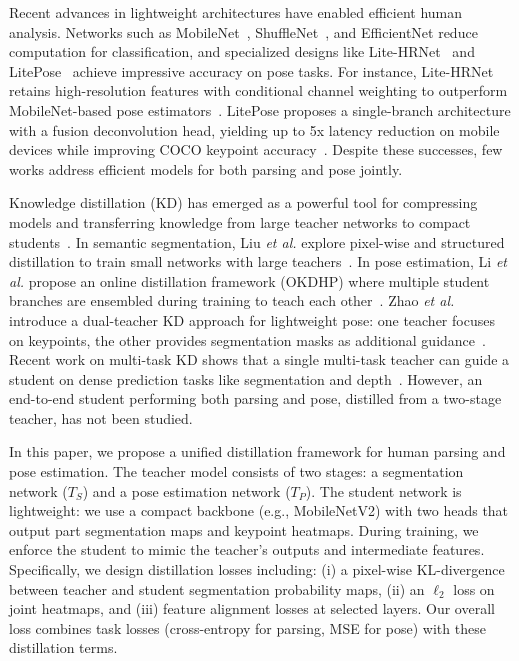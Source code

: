 \documentclass{article}
\begin{document}
Recent advances in lightweight architectures have enabled efficient human analysis. Networks such as MobileNet~\cite{howard2017mobilenets}, ShuffleNet~\cite{zhang2018shufflenet}, and EfficientNet reduce computation for classification, and specialized designs like Lite-HRNet~\cite{yu2021litehrnet} and LitePose~\cite{wang2022litepose} achieve impressive accuracy on pose tasks. For instance, Lite-HRNet retains high-resolution features with conditional channel weighting to outperform MobileNet-based pose estimators~\cite{yu2021litehrnet}. LitePose proposes a single-branch architecture with a fusion deconvolution head, yielding up to 5x latency reduction on mobile devices while improving COCO keypoint accuracy~\cite{wang2022litepose}. Despite these successes, few works address efficient models for both parsing and pose jointly.

Knowledge distillation (KD) has emerged as a powerful tool for compressing models and transferring knowledge from large teacher networks to compact students~\cite{hinton2015distilling,liu2019structured}. In semantic segmentation, Liu \textit{et al.} explore pixel-wise and structured distillation to train small networks with large teachers~\cite{liu2019structured}. In pose estimation, Li \textit{et al.} propose an online distillation framework (OKDHP) where multiple student branches are ensembled during training to teach each other~\cite{li2021okdhp}. Zhao \textit{et al.} introduce a dual-teacher KD approach for lightweight pose: one teacher focuses on keypoints, the other provides segmentation masks as additional guidance~\cite{zhao2021odkd}. Recent work on multi-task KD shows that a single multi-task teacher can guide a student on dense prediction tasks like segmentation and depth~\cite{xu2023mtlkd}. However, an end-to-end student performing both parsing and pose, distilled from a two-stage teacher, has not been studied.

In this paper, we propose a unified distillation framework for human parsing and pose estimation. The teacher model consists of two stages: a segmentation network ($T_S$) and a pose estimation network ($T_P$). The student network is lightweight: we use a compact backbone (e.g., MobileNetV2) with two heads that output part segmentation maps and keypoint heatmaps. During training, we enforce the student to mimic the teacher’s outputs and intermediate features. Specifically, we design distillation losses including: (i) a pixel-wise KL-divergence between teacher and student segmentation probability maps, (ii) an $\ell_2$ loss on joint heatmaps, and (iii) feature alignment losses at selected layers. Our overall loss combines task losses (cross-entropy for parsing, MSE for pose) with these distillation terms.
\end{document}
